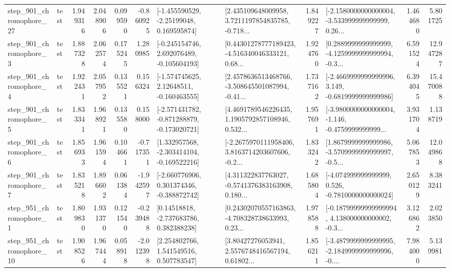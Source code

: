 \begin{tabular}{llrrrrllrlrr}
  step\_901\_chromophore\_27 &      test &      1.949316 &    2.048906 &      0.099590 & -0.860925 &    [-1.455590529, -2.25199048, 0.169595874] &  [2.435109648009958, 3.7211197854835785, -0.718... &       1.849227 &  [-2.1580000000000004, -3.533999999999999, 0.26... &            1.464680 &          5.801725 \\
   step\_901\_chromophore\_3 &      test &      1.887328 &    2.062574 &      0.175245 &  1.280985 &   [-0.245154746, 2.692076489, -0.105604193] &  [0.44301278777189423, -4.516340046333121, 0.68... &       1.924760 &  [0.2889999999999999, -4.1259999999999994, -0.3... &            6.591524 &         12.947287 \\
   step\_901\_chromophore\_4 &      test &      1.922431 &    2.057952 &      0.135521 &  0.156324 &    [-1.574745625, 2.12648511, -0.160463555] &  [2.4578636513468766, -3.508645501087994, -0.41... &       1.737162 &  [-2.4669999999999996, 3.149, -0.6819999999999986] &            6.394045 &         15.470088 \\
   step\_901\_chromophore\_5 &      test &      1.833341 &    1.968921 &      0.135580 &  0.158000 &  [-2.571431782, -0.871288879, -0.173020721] &  [4.4691789546226435, 1.1905792857108946, 0.532... &       1.957691 &  [-3.9800000000000004, -1.146, -0.4759999999999... &            3.931704 &          1.138719 \\
   step\_901\_chromophore\_6 &      test &      1.856933 &    1.961594 &      0.104661 & -0.717351 &   [1.332957568, -2.303414104, -0.169522216] &  [-2.2675970111958406, 3.8163714203607606, -0.2... &       1.833242 &  [1.8679999999999986, -3.5709999999999997, -0.5... &            5.067853 &         12.049868 \\
   step\_901\_chromophore\_7 &      test &      1.835218 &    1.896602 &      0.061384 & -1.942597 &   [-2.660776906, 0.301374346, -0.388872742] &  [4.311322837763027, -0.5741376383163908, 0.180... &       1.685804 &   [-4.074999999999999, 0.526, -0.7810000000000024] &            2.650129 &          8.383241 \\
   step\_951\_chromophore\_1 &      test &      1.809830 &    1.931370 &      0.121540 & -0.239488 &     [0.14518818, -2.737683786, 0.382388238] &  [0.24302070557163863, -4.708328738633993, 0.23... &       1.978588 &  [-0.18799999999999994, 4.138000000000002, -0.3... &            3.126862 &          2.023850 \\
  step\_951\_chromophore\_10 &      test &      1.908526 &    1.967444 &      0.058918 & -2.012398 &     [2.254802766, 1.541549516, 0.507783547] &  [3.80427276053941, 2.5576748416567194, 0.61802... &       1.856211 &  [-3.4879999999999995, -2.1849999999999996, -0.... &            7.984000 &          5.139981 \\

\end{tabular}
